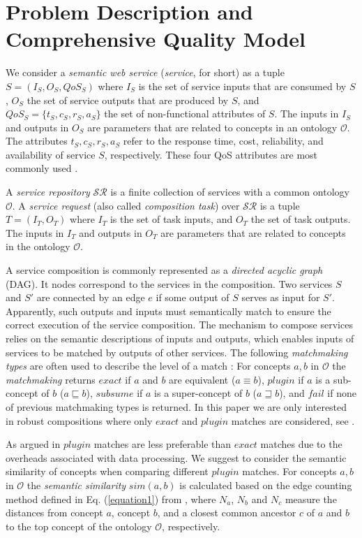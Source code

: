 \section{Problem Description and Comprehensive Quality Model}

We consider a \emph{semantic web service} (\emph{service}, for short) as a tuple $S = (I_{S}, O_{S}, QoS_S)$ where $I_{S}$ is the set of service inputs that are consumed by $S$, $O_{S}$ the set of service outputs that are produced by $S$, and $QoS_{S}=\{t_S, c_S, r_S, a_S\}$ the set of non-functional attributes of $S$. The inputs in $I_{S}$ and outputs in $O_{S}$ are parameters that are related to concepts in an ontology $\mathcal{O}$. The attributes $t_S, c_S, r_S, a_S$ refer to the response time, cost, reliability, and availability of service $S$, respectively. These four QoS attributes are most commonly used \cite{zeng2003quality}.

A \emph{service repository} $\mathcal{SR}$ is a finite collection of services with a common ontology $\mathcal{O}$. A \emph{service request} (also called \emph{composition task}) over $\mathcal{SR}$ is a tuple $T=(I_{T}, O_{T})$ where $I_{T}$ is the set of task inputs, and $O_{T}$ the set of task outputs. The inputs in $I_{T}$ and outputs in $O_{T}$ are parameters that are related to concepts in the ontology $\mathcal{O}$.

A service composition is commonly represented as a \emph{directed acyclic graph} (DAG). It nodes correspond to the services in the composition. Two services $S$ and $S'$ are connected by an edge $e$ if some output of $S$ serves as input for $S'$. Apparently, such outputs and inputs must semantically match to ensure the correct execution of the service composition. 
The mechanism to compose services relies on the semantic descriptions of inputs and outputs, which enables inputs of services to be matched by outputs of other services. The following \emph{matchmaking types} are often used to describe the level of a match \cite{paolucci2002semantic}: For concepts $a, b$ in $\mathcal{O}$ the \emph{matchmaking} returns $exact$ if $a$ and $b$ are equivalent ($a \equiv b$), $plugin$ if $a$ is a sub-concept of $b$ ($a \sqsubseteq b$), $subsume$ if $a$ is a super-concept of $b$ ($a \sqsupseteq b$), and $fail$ if none of previous matchmaking types is returned.
In this paper we are only interested in robust compositions where only $exact$ and $plugin$ matches are considered, see \cite{lecue2009optimizing}. 

As argued in \cite{lecue2009optimizing} $plugin$ matches are less preferable than $exact$ matches due to the overheads associated with data processing. We suggest to consider the semantic similarity of concepts when comparing different $plugin$ matches. For concepts $a, b$ in $\mathcal{O}$ the \emph{semantic similarity} $sim(a, b)$ is calculated based on the edge counting method defined in Eq. (\ref{equation1}) from \cite{shet2012new}, where $N_a$, $N_b$ and $N_c$ measure the distances from concept $a$, concept $b$, and a closest common ancestor $c$ of $a$ and $b$ to the top concept of the ontology $\mathcal{O}$, respectively. 

